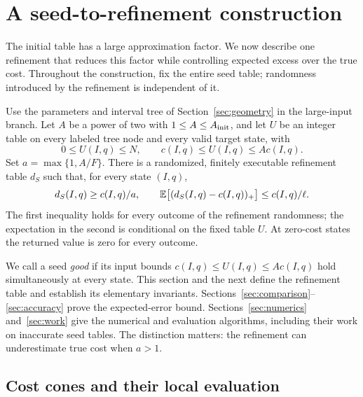 \section{A seed-to-refinement construction}\label{sec:cones}

The initial table has a large approximation factor.  We now describe one
refinement that reduces this factor while controlling expected excess over
the true cost.  Throughout the construction, fix the entire seed table;
randomness introduced by the refinement is independent of it.

\begin{theorem}[Refinement]\label{thm:refinement}
Use the parameters and interval tree of Section~\ref{sec:geometry} in the
large-input branch.  Let $A$ be a power of two with
$1\le A\le A_{\rm init}$, and let $U$ be an integer table on every labeled
tree node and every valid target state, with
\[
 0\le U(I,q)\le N,\qquad c(I,q)\le U(I,q)\le A c(I,q).
\]
Set $a=\max\{1,A/F\}$.  There is a randomized, finitely executable
refinement table $d_S$ such that, for every state $(I,q)$,
\begin{equation}\label{eq:refinement-guarantee}
 d_S(I,q)\ge c(I,q)/a,\qquad
 \mathbb E\bigl[(d_S(I,q)-c(I,q))_+\bigr]\le c(I,q)/\ell.
\end{equation}
The first inequality holds for every outcome of the refinement randomness;
the expectation in the second is conditional on the fixed table $U$.
At zero-cost states the returned value is zero for every outcome.
\end{theorem}

We call a seed \emph{good} if its input bounds
$c(I,q)\le U(I,q)\le A c(I,q)$ hold simultaneously at every state.
This section and the next define the refinement table
and establish its elementary
invariants.  Sections~\ref{sec:comparison}--\ref{sec:accuracy} prove the
expected-error bound.  Sections~\ref{sec:numerics} and~\ref{sec:work} give
the numerical and evaluation algorithms, including their work on
inaccurate seed tables.  The distinction matters: the refinement can
underestimate true cost when $a>1$.

\subsection{Cost cones and their local evaluation}

